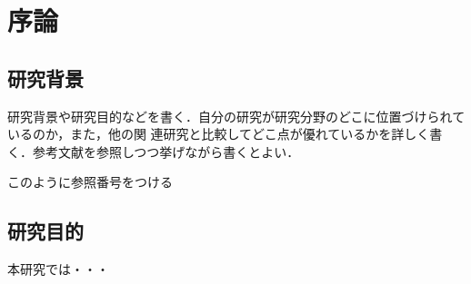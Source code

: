 ﻿%
\chapter{序論}

\section{研究背景}

研究背景や研究目的などを書く．自分の研究が研究分野のどこに位置づけられているのか，また，他の関
連研究と比較してどこ点が優れているかを詳しく書く．参考文献を参照しつつ挙げながら書くとよい．

このように参照番号をつける\cite{asimo}

\section{研究目的}

本研究では・・・